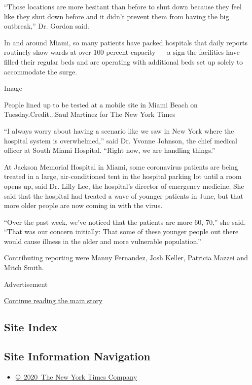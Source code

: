 ``Those locations are more hesitant than before to shut down because
they feel like they shut down before and it didn't prevent them from
having the big outbreak,'' Dr. Gordon said.

In and around Miami, so many patients have packed hospitals that daily
reports routinely show wards at over 100 percent capacity --- a sign the
facilities have filled their regular beds and are operating with
additional beds set up solely to accommodate the surge.

Image

People lined up to be tested at a mobile site in Miami Beach on
Tuesday.Credit...Saul Martinez for The New York Times

``I always worry about having a scenario like we saw in New York where
the hospital system is overwhelmed,'' said Dr. Yvonne Johnson, the chief
medical officer at South Miami Hospital. ``Right now, we are handling
things.''

At Jackson Memorial Hospital in Miami, some coronavirus patients are
being treated in a large, air-conditioned tent in the hospital parking
lot until a room opens up, said Dr. Lilly Lee, the hospital's director
of emergency medicine. She said that the hospital had treated a wave of
younger patients in June, but that more older people are now coming in
with the virus.

``Over the past week, we've noticed that the patients are more 60, 70,''
she said. ``That was our concern initially: That some of these younger
people out there would cause illness in the older and more vulnerable
population.''

Contributing reporting were Manny Fernandez, Josh Keller, Patricia
Mazzei and Mitch Smith.

Advertisement

\protect\hyperlink{after-bottom}{Continue reading the main story}

\hypertarget{site-index}{%
\subsection{Site Index}\label{site-index}}

\hypertarget{site-information-navigation}{%
\subsection{Site Information
Navigation}\label{site-information-navigation}}

\begin{itemize}
\tightlist
\item
  \href{https://help.nytimes.com/hc/en-us/articles/115014792127-Copyright-notice}{©~2020~The
  New York Times Company}
\end{itemize}

